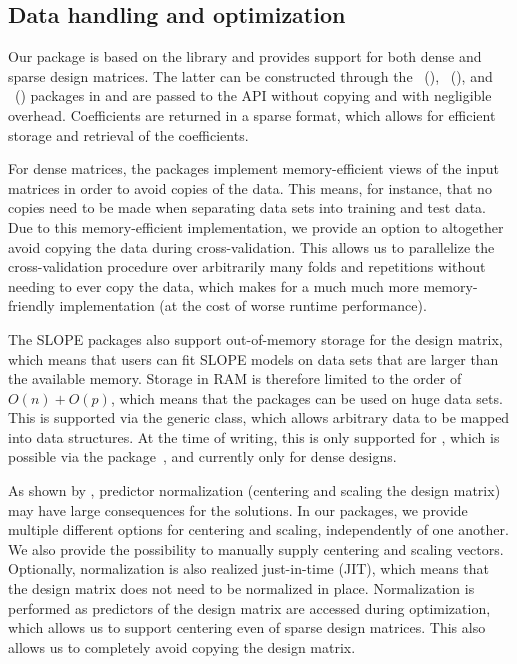 \documentclass[article]{jss}
\begin{document}
\subsection{Data handling and optimization}

Our package is based on the   library and provides
support for both dense and sparse design matrices. The latter can be
constructed through the ~(),
~(), and ~()
packages in and are passed to the  API without copying
and with negligible overhead. Coefficients are returned in a sparse format, which
allows for efficient storage and retrieval of the coefficients.

For dense matrices, the packages implement memory-efficient views of the input
matrices in order to avoid copies of the data. This means, for instance, that
no copies need to be made when separating data sets into training and test
data. Due to this memory-efficient implementation, we provide an option to
altogether avoid copying the data during cross-validation. This allows us to
parallelize the cross-validation procedure over arbitrarily many folds and
repetitions without needing to ever copy the data, which makes for a much
much more memory-friendly implementation (at the cost of
worse runtime performance).

The SLOPE packages also support out-of-memory storage for the design matrix, which
means that users can fit SLOPE models on data sets that are larger than the
available memory. Storage in RAM is therefore limited to the order of \(O(n) +
O(p)\), which means that the packages can be used on huge data sets.
This is supported via the generic  class, which allows
arbitrary data to be mapped into  data structures. At the
time of writing, this is only supported for ,
which is possible via the  package~\citep{kane2013},
and currently only for dense designs.

As shown by \citet{larsson2025}, predictor normalization (centering and
scaling the design matrix) may have large consequences for the
solutions. In our packages, we provide multiple different options
for centering and scaling, independently of one another.
We also provide the possibility to manually supply centering
and scaling vectors. Optionally, normalization is also realized just-in-time (JIT),
which means that the design matrix does not need to be normalized in place.
Normalization is performed as predictors of the design matrix are accessed during
optimization, which allows us to support centering even of sparse design
matrices. This also allows us to completely avoid copying the design matrix.
\end{document}
